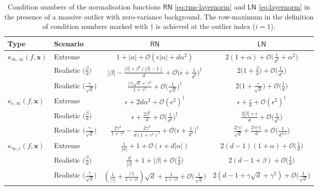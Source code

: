 \documentclass[namedate,webpdf,imanum]{ima-authoring-template}
\newcommand{\Matrix}[1]{\mathbf{#1}}
\newcommand{\Layer}[1]{\mathsf{#1}}
\newcommand{\cond}[3][]{\kappa_{\mathrm{#2}} #1( #3 #1)}
\newcommand{\Oh}[2][]{\mathcal{O}#1( #2 #1)}
\numberwithin{equation}{section}
\begin{document}
\begin{table}[t]
\caption{Condition numbers of the normalisation functions $\Layer{RN}$ \eqref{eq:rms-layernorm} and $\Layer{LN}$ \eqref{eq:layernorm} in the presence of a massive outlier with zero-variance background.
The row-maximum in the definition of condition numbers marked with $\dagger$ is achieved at the outlier index ($i = 1$).}
\label{tab:rn_ln_zero_variance}
\begin{tabular}{@{}llcc@{}}
\toprule
Type & Scenario & $\Layer{RN}$ & $\Layer{LN}$ \\
\midrule
$\cond{\infty,\infty}{f,\Matrix{x}}$
& Extreme
& $1 + |\alpha| + \Oh{\epsilon|\alpha| + d \alpha^2}$
& $2(1 + \alpha) + \Oh[\Big]{\frac{1}{d^2} + \alpha^2}$ \\
%
& Realistic $\Big(\tfrac{\beta}{d}\Big)$
& $|\beta| - \frac{|\beta| + \beta^2(|\beta| - 1)}{d} + \Oh[\Big]{\epsilon + \frac{1}{d^2}}^\dagger$
& $2\Big(1 + \frac{\beta}{d}\Big) + \Oh[\Big]{\frac{1}{d^2}}$ \\
& Realistic $\Big(\tfrac{\gamma}{\sqrt{d}}\Big)$
& $\frac{|\gamma|\sqrt{d} + \gamma^2}{1+\gamma^2} + \Oh[\Big]{\frac{1}{\sqrt{d}}}^\dagger$
& $2\Big(1 + \frac{\gamma}{\sqrt{d}}\Big) + \Oh[\Big]{\frac{1}{d}}$ \\
\midrule
$\cond{c,\infty}{f,\Matrix{x}}$
& Extreme
& $\epsilon + 2d\alpha^2 + \Oh{\epsilon^2}^\dagger$
& $\epsilon + \frac{\epsilon}{d} + \Oh{\epsilon^2}^\dagger$ \\
%
& Realistic $\Big(\tfrac{\beta}{d}\Big)$
& $\epsilon + \frac{2\beta^2}{d} + \Oh[\Big]{\frac{1}{d^2}}^\dagger$
& $\frac{2|\beta| + \epsilon}{d} + \Oh[\Big]{\frac{1}{d^2}}$ \\
%
& Realistic $\Big(\tfrac{\gamma}{\sqrt{d}}\Big)$
& $\frac{2\gamma^2}{1+\gamma^2} - \frac{2\gamma^2}{d(1+\gamma^2)^2} + \Oh[\Big]{\epsilon + \frac{1}{d^2}}^\dagger$
& $\frac{2|\gamma|}{\sqrt{d}} + \frac{2\gamma|\gamma|}{d} + \Oh[\Big]{\frac{1}{d^{3/2}}}$ \\
\midrule
$\cond{\infty,c}{f,\Matrix{x}}$
& Extreme
& $\frac{1}{|\alpha|} + 1 + \Oh{\epsilon + d|\alpha|}$
& $2(d-1)(1 + \alpha) + \Oh[\Big]{\frac{1}{d}}$ \\
%
& Realistic $\Big(\tfrac{\beta}{d}\Big)$
& $\frac{d}{|\beta|} + 1 + |\beta| + \Oh[\Big]{\frac{1}{d}}$
& $2(d-1+\beta) + \Oh[\Big]{\frac{1}{d}}$ \\
%
& Realistic $\Big(\tfrac{\gamma}{\sqrt{d}}\Big)$
& $\left(\frac{1}{|\gamma|} + \frac{|\gamma|}{1+\gamma^2}\right)\sqrt{d} + \frac{1}{1+\gamma^2} + \Oh[\Big]{\frac{1}{\sqrt{d}}}$
& $2(d - 1 + \gamma\sqrt{d} + \gamma^2) + \Oh[\Big]{\frac{1}{\sqrt{d}}}$ \\

\end{tabular}
\end{table}
\end{document}
